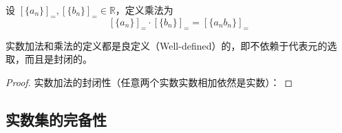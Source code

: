 \begin{definition}
    设 $[\{a_n\}]_{=},[\{b_n\}]_{=}\in\mathbb{R}$，定义乘法为
    \[
        [\{a_n\}]_{=} \cdot [\{b_n\}]_{=} = [\{a_nb_n\}]_{=}
    \]
\end{definition}

\begin{proposition}
    实数加法和乘法的定义都是良定义（Well-defined）的，即不依赖于代表元的选取，而且是封闭的。
\end{proposition}

\begin{proof}
    实数加法的封闭性（任意两个实数实数相加依然是实数）：
\end{proof}

\subsection{实数集的完备性}

\newpage